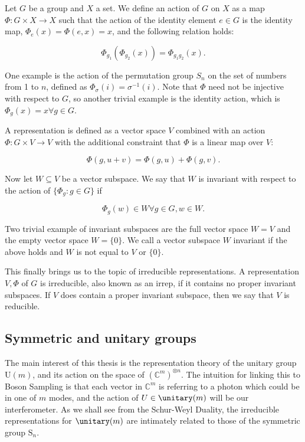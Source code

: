 Let $G$ be a group and $X$ a set. We define an action of $G$ on $X$ as a map $\Phi\colon G\times X \rightarrow X$ such that the action of the identity element $e\in G$ is the identity map, $\Phi_e(x) = \Phi(e, x) = x$, and the following relation holds:

\begin{equation}
\Phi_{g_1}(\Phi_{g_2}(x)) = \Phi_{g_1g_2}(x).
\end{equation}

One example is the action of the permutation group $S_n$ on the set of numbers from 1 to $n$, defined as $\Phi_\sigma(i) = \sigma^{-1}(i)$. Note that $\Phi$ need not be injective with respect to $G$, so another trivial example is the identity action, which is $\Phi_g(x) = x \forall g \in G$.

A representation is defined as a vector space $V$ combined with an action $\Phi: G \times V \rightarrow V$ with the additional constraint that $\Phi$ is a linear map over $V$:

\begin{equation}
\Phi(g, u+v) = \Phi(g, u) + \Phi(g, v).
\end{equation}

Now let $W \subseteq V$ be a vector subspace. We say that $W$ is invariant with respect to the action of $\{\Phi_g\colon g\in G\}$ if

\begin{equation}
\Phi_g(w) \in W \forall g \in G, w \in W.
\end{equation}

Two trivial example of invariant subspaces are the full vector space $W=V$ and the empty vector space $W=\{0\}$. We call a vector subspace $W$ invariant if the above holds and $W$ is not equal to $V$ or $\{0\}$.

This finally brings us to the topic of irreducible representations. A representation $V, \Phi$ of $G$ is irreducible, also known as an irrep, if it contains no proper invariant subspaces. If $V$ does contain a proper invariant subspace, then we say that $V$ is reducible.

\subsection{Symmetric and unitary groups}

The main interest of this thesis is the representation theory of the unitary group U$(m)$, and its action on the space of $(\mathbb{C}^{m})^{\otimes n}$. The intuition for linking this to Boson Sampling is that each vector in $\mathbb{C}^m$ is referring to a photon which could be in one of $m$ modes, and the action of $U \in \unitary(m)$ will be our interferometer.
As we shall see from the Schur-Weyl Duality, the irreducible representations for $\unitary(m)$ are intimately related to those of the symmetric group $\textrm{S}_n$.

